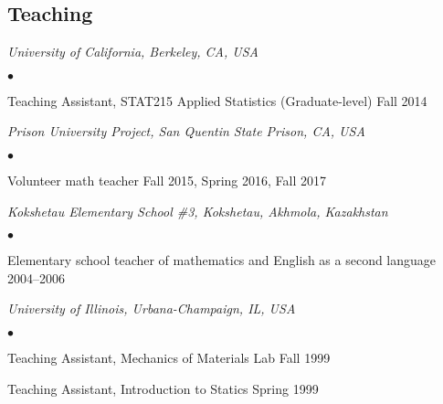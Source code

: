 \documentclass[margin,line]{res}
\newenvironment{list2}{
  \begin{list}{$\bullet$}{%
      \setlength{\itemsep}{0in}
      \setlength{\parsep}{0in} \setlength{\parskip}{0in}
      \setlength{\topsep}{0in} \setlength{\partopsep}{0in}
      \setlength{\leftmargin}{0.2in}}}{\end{list}}
\begin{document}
\begin{resume}
\section{\sc Teaching}

\emph{University of California, Berkeley, CA, USA}
\begin{list2}
\item Teaching Assistant, STAT215 Applied Statistics
(Graduate-level) \hfill Fall 2014
\end{list2}

\emph{Prison University Project, San Quentin State Prison, CA, USA}
\begin{list2}
\item Volunteer math teacher
\hfill Fall 2015, Spring 2016, Fall 2017
\end{list2}

\emph{Kokshetau Elementary School \#3, Kokshetau, Akhmola, Kazakhstan}
\begin{list2}
\item Elementary school teacher of mathematics and English as a second language
\hfill 2004--2006
\end{list2}

\emph{University of Illinois, Urbana-Champaign, IL, USA}
\begin{list2}
\item Teaching Assistant, Mechanics of Materials Lab \hfill Fall 1999
\item Teaching Assistant, Introduction to Statics \hfill Spring 1999
\end{list2}

\end{resume}
\end{document}
